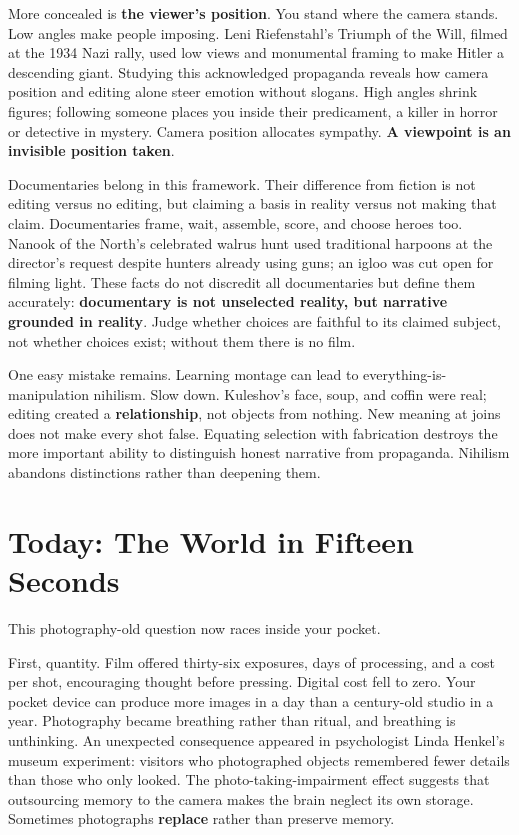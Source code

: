 More concealed is \textbf{the viewer's position}. You stand where the camera stands. Low angles make people imposing. Leni Riefenstahl's Triumph of the Will, filmed at the 1934 Nazi rally, used low views and monumental framing to make Hitler a descending giant. Studying this acknowledged propaganda reveals how camera position and editing alone steer emotion without slogans. High angles shrink figures; following someone places you inside their predicament, a killer in horror or detective in mystery. Camera position allocates sympathy. \textbf{A viewpoint is an invisible position taken}.

Documentaries belong in this framework. Their difference from fiction is not editing versus no editing, but claiming a basis in reality versus not making that claim. Documentaries frame, wait, assemble, score, and choose heroes too. Nanook of the North's celebrated walrus hunt used traditional harpoons at the director's request despite hunters already using guns; an igloo was cut open for filming light. These facts do not discredit all documentaries but define them accurately: \textbf{documentary is not unselected reality, but narrative grounded in reality}. Judge whether choices are faithful to its claimed subject, not whether choices exist; without them there is no film.

One easy mistake remains. Learning montage can lead to everything-is-manipulation nihilism. Slow down. Kuleshov's face, soup, and coffin were real; editing created a \textbf{relationship}, not objects from nothing. New meaning at joins does not make every shot false. Equating selection with fabrication destroys the more important ability to distinguish honest narrative from propaganda. Nihilism abandons distinctions rather than deepening them.

\section{Today: The World in Fifteen Seconds}
This photography-old question now races inside your pocket.

First, quantity. Film offered thirty-six exposures, days of processing, and a cost per shot, encouraging thought before pressing. Digital cost fell to zero. Your pocket device can produce more images in a day than a century-old studio in a year. Photography became breathing rather than ritual, and breathing is unthinking. An unexpected consequence appeared in psychologist Linda Henkel's museum experiment: visitors who photographed objects remembered fewer details than those who only looked. The photo-taking-impairment effect suggests that outsourcing memory to the camera makes the brain neglect its own storage. Sometimes photographs \textbf{replace} rather than preserve memory.


